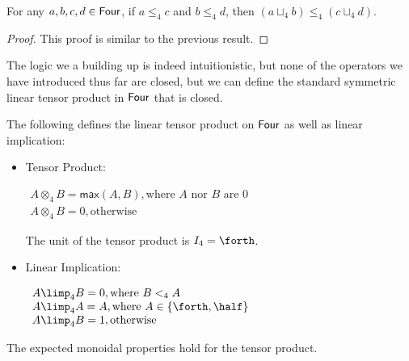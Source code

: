 \begin{lemma}
  \label{lemma:parallel_conjunction_is_functorial}
  For any $a,b,c,d \in \mathsf{Four}$, if $a \leq_4 c$ and $b \le_4 d$, then
  $(a \sqcup_4 b) \leq_4 (c \sqcup_4 d)$.
\end{lemma}
\begin{proof}
  This proof is similar to the previous result.
\end{proof}

The logic we a building up is indeed intuitionistic, but none of the
operators we have introduced thus far are closed, but we can define
the standard symmetric linear tensor product in $\mathsf{Four}$ that is
closed.
\begin{definition}
  \label{def:tensor-and-implication}
  The following defines the linear tensor product on $\mathsf{Four}$ as well
  as linear implication:
  \begin{itemize}
  \item[] Tensor Product:
    \begin{center}
      \begin{math}
        \begin{array}{lll}
          A \otimes_4 B = \mathsf{max}(A,B), \text{where $A$ nor $B$ are $0$}\\
          A \otimes_4 B = 0, \text{otherwise}
        \end{array}
      \end{math}
    \end{center}
    The unit of the tensor product is $I_4 = \forth$.\\
    
  \item[] Linear Implication:
    \begin{center}
      \begin{math}
        \begin{array}{lll}
          A \limp_4 B = 0, \text{where $B <_4 A$}\\
          A \limp_4 A = A, \text{where $A \in \{\forth,\half\}$}\\
          A \limp_4 B = 1, \text{otherwise}
        \end{array}
      \end{math}
    \end{center}
  \end{itemize}
\end{definition}
The expected monoidal properties hold for the tensor product.
